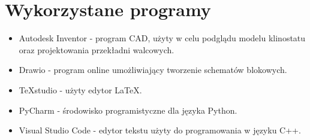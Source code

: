 \chapter*{Wykorzystane programy}

\begin{itemize}
	\item Autodesk Inventor - program CAD, użyty w celu podglądu modelu klinostatu oraz projektowania przekładni walcowych.
	\item Drawio - program online umożliwiający tworzenie schematów blokowych.
	\item TeXstudio - użyty edytor LaTeX.
	\item PyCharm - środowisko programistyczne dla języka Python.
	\item Visual Studio Code - edytor tekstu użyty do programowania w języku C++.
\end{itemize}\textbf{}